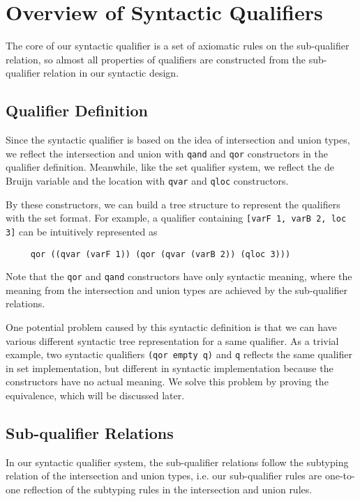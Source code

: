 \section{Overview of Syntactic Qualifiers} \label{sec:overview}

The core of our syntactic qualifier is a set of axiomatic rules on the sub-qualifier relation, so almost all properties of qualifiers are constructed from the sub-qualifier relation in our syntactic design. 

\subsection{Qualifier Definition}

Since the syntactic qualifier is based on the idea of intersection and union types, we reflect the intersection and union with \texttt{qand} and \texttt{qor} constructors in the qualifier definition. Meanwhile, like the set qualifier system, we reflect the de Bruijn variable and the location with \texttt{qvar} and \texttt{qloc} constructors. 

By these constructors, we can build a tree structure to represent the qualifiers with the set format. For example, a qualifier containing \texttt{[varF 1, varB 2, loc 3]} can be intuitively represented as 
\begin{lstlisting}
     qor ((qvar (varF 1)) (qor (qvar (varB 2)) (qloc 3)))
\end{lstlisting}

Note that the \texttt{qor} and \texttt{qand} constructors have only syntactic meaning, where the meaning from the intersection and union types are achieved by the sub-qualifier relations.

One potential problem caused by this syntactic definition is that we can have various different syntactic tree representation for a same qualifier. As a trivial example, two syntactic qualifiers \texttt{(qor empty q)} and \texttt{q} reflects the same qualifier in set implementation, but different in syntactic implementation because the constructors have no actual meaning. We solve this problem by proving the equivalence, which will be discussed later.


\subsection{Sub-qualifier Relations}

In our syntactic qualifier system, the sub-qualifier relations follow the subtyping relation of the intersection and union types, i.e. our sub-qualifier rules are one-to-one reflection of the subtyping rules in the intersection and union rules. 


